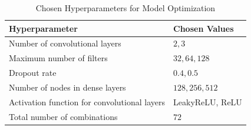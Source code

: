 \begin{table}[H]
    \centering
    \begin{tabular}{ll}
        \toprule
        \textbf{Hyperparameter} & \textbf{Chosen Values} \\
        \midrule
        Number of convolutional layers               & {$2, 3$}\\
        Maximum number of filters                    & {$32, 64, 128$}\\
        Dropout rate                                 & {$0.4, 0.5$}\\
        Number of nodes in dense layers              & {$128, 256, 512$}\\
        Activation function for convolutional layers & {LeakyReLU, ReLU}\\
        Total number of combinations                 & $72$\\
        \bottomrule
    \end{tabular}
    \caption{Chosen Hyperparameters for Model Optimization}
    \label{tab:hyperparameters}
\end{table}


